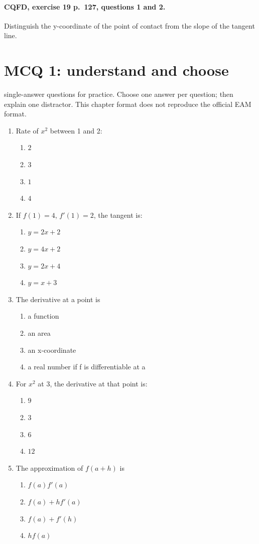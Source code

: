 \paragraph{CQFD, exercise 19 p.~127, questions 1 and 2.}\label{C04-M2} Distinguish the y-coordinate of the point of contact from the slope of the tangent line.
\begingroup\small
\mxnewpage\section*{MCQ 1: understand and choose}\label{C04-Q1}
 single-answer questions for practice. Choose one answer per question; then explain one distractor. This chapter format does not reproduce the official EAM format.
\begin{enumerate}
\item Rate of $x^2$ between 1 and 2:
\begin{enumerate}[label=\Alph*.,itemsep=2pt]
\item $2$
\item $3$
\item $1$
\item $4$
\end{enumerate}
\item If $f(1)=4$, $f\prime(1)=2$, the tangent is:
\begin{enumerate}[label=\Alph*.,itemsep=2pt]
\item $y=2x+2$
\item $y=4x+2$
\item $y=2x+4$
\item $y=x+3$
\end{enumerate}
\item The derivative at a point is
\begin{enumerate}[label=\Alph*.,itemsep=2pt]
\item a function
\item an area
\item an x-coordinate
\item a real number if f is differentiable at a
\end{enumerate}
\item For $x^2$ at 3, the derivative at that point is:
\begin{enumerate}[label=\Alph*.,itemsep=2pt]
\item $9$
\item $3$
\item $6$
\item $12$
\end{enumerate}
\item The approximation of $f(a+h)$ is
\begin{enumerate}[label=\Alph*.,itemsep=2pt]
\item $f(a)f\prime(a)$
\item $f(a)+hf\prime(a)$
\item $f(a)+f\prime(h)$
\item $hf(a)$
\end{enumerate}
\end{enumerate}
